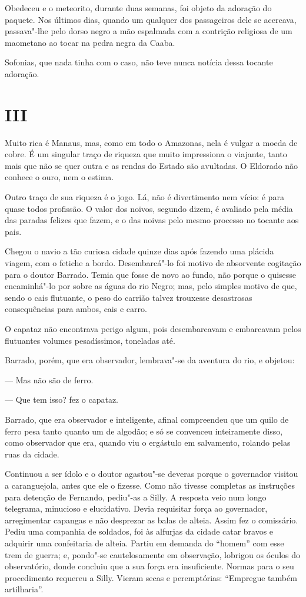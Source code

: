 Obedeceu e o meteorito, durante duas semanas, foi objeto da adoração do
paquete. Nos últimos dias, quando um qualquer dos passageiros dele se
acercava, passava"-lhe pelo dorso negro a mão espalmada com a contrição
religiosa de um maometano ao tocar na pedra negra da Caaba.

Sofonias, que nada tinha com o caso, não teve nunca notícia dessa
tocante adoração.

\section{III}

Muito rica é Manaus, mas, como em todo o Amazonas, nela é vulgar a moeda
de cobre. É um singular traço de riqueza que muito impressiona o
viajante, tanto mais que não se quer outra e as rendas do Estado são
avultadas. O Eldorado não conhece o ouro, nem o estima.

Outro traço de sua riqueza é o jogo. Lá, não é divertimento nem vício: é
para quase todos profissão. O valor dos noivos, segundo dizem, é
avaliado pela média das paradas felizes que fazem, e o das noivas pelo
mesmo processo no tocante aos pais.

Chegou o navio a tão curiosa cidade quinze dias após fazendo uma plácida
viagem, com o fetiche a bordo. Desembarcá"-lo foi motivo de absorvente
cogitação para o doutor Barrado. Temia que fosse de novo ao fundo, não
porque o quisesse encaminhá"-lo por sobre as águas do rio Negro; mas,
pelo simples motivo de que, sendo o cais flutuante, o peso do carrião
talvez trouxesse desastrosas consequências para ambos, cais e carro.

O capataz não encontrava perigo algum, pois desembarcavam e embarcavam
pelos flutuantes volumes pesadíssimos, toneladas até.

Barrado, porém, que era observador, lembrava"-se da aventura do rio, e
objetou:

--- Mas não são de ferro.

--- Que tem isso? fez o capataz.

Barrado, que era observador e inteligente, afinal compreendeu que um
quilo de ferro pesa tanto quanto um de algodão; e só se convenceu
inteiramente disso, como observador que era, quando viu o ergástulo em
salvamento, rolando pelas ruas da cidade.

Continuou a ser ídolo e o doutor agastou"-se deveras porque o governador
visitou a caranguejola, antes que ele o fizesse. Como não tivesse
completas as instruções para detenção de Fernando, pediu"-as a Silly. A
resposta veio num longo telegrama, minucioso e elucidativo. Devia
requisitar força ao governador, arregimentar capangas e não desprezar as
balas de alteia. Assim fez o comissário. Pediu uma companhia de
soldados, foi às alfurjas da cidade catar bravos e adquirir uma
confeitaria de alteia. Partiu em demanda do ``homem'' com esse trem de
guerra; e, pondo"-se cautelosamente em observação, lobrigou os óculos do
observatório, donde concluiu que a sua força era insuficiente. Normas
para o seu procedimento requereu a Silly. Vieram secas e peremptórias:
``Empregue também artilharia''.

